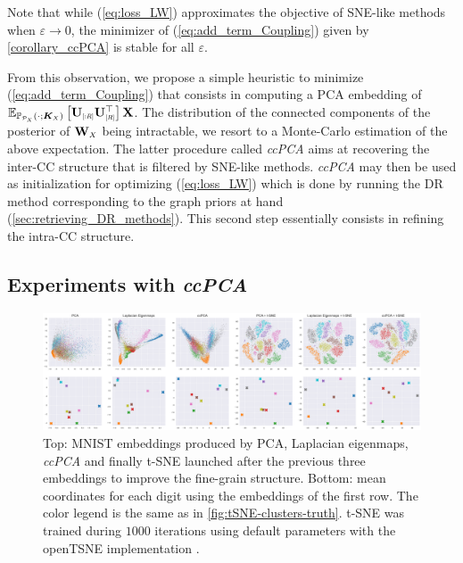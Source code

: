 \begin{remark}
Note that while (\ref{eq:loss_LW}) approximates the objective of SNE-like methods when $\varepsilon \to 0$, the minimizer of (\ref{eq:add_term_Coupling}) given by \cref{corollary_ccPCA} is stable for all $\varepsilon$.
\end{remark}

From this observation, we propose a simple heuristic to minimize (\ref{eq:add_term_Coupling}) that consists in computing a PCA embedding of $\mathbb{E}_{\mathbb{P}_{\scaleto{\mathcal{P}_X}{4pt}}(\cdot;\bm{K}_{\scaleto{X}{3pt}})}\left[ \Ub_{\scaleto{[:R]}{5pt}}\Ub_{\scaleto{[R]}{5pt}}^\top \right]\Xb$. The distribution of the connected components of the posterior of $\Wb_{\scaleto{X}{4pt}}$ being intractable, we resort to a Monte-Carlo estimation of the above expectation. The latter procedure called \textit{ccPCA} aims at recovering the inter-CC structure that is filtered by SNE-like methods. \textit{ccPCA} may then be used as initialization for optimizing (\ref{eq:loss_LW}) which is done by running the DR method corresponding to the graph priors at hand (\cref{sec:retrieving_DR_methods}). This second step essentially consists in refining the intra-CC structure. 

\subsection{Experiments with \textit{ccPCA}}\label{sec:ccPCA}

\begin{figure}[t]
\begin{center}
\centerline{\includegraphics[width=\columnwidth]{Figures/cluster_positions.pdf}}
\caption{Top: MNIST embeddings produced by PCA, Laplacian eigenmaps, \textit{ccPCA} and finally t-SNE launched after the previous three embeddings to improve the fine-grain structure. Bottom: mean coordinates for each digit using the embeddings of the first row. The color legend is the same as in \cref{fig:tSNE-clusters-truth}. t-SNE was trained during $1000$ iterations using default parameters with the openTSNE implementation \cite{polivcar2019opentsne}.}
\label{fig:methods_embeddings}
\end{center}
\vspace{-0.8cm}
\end{figure}


